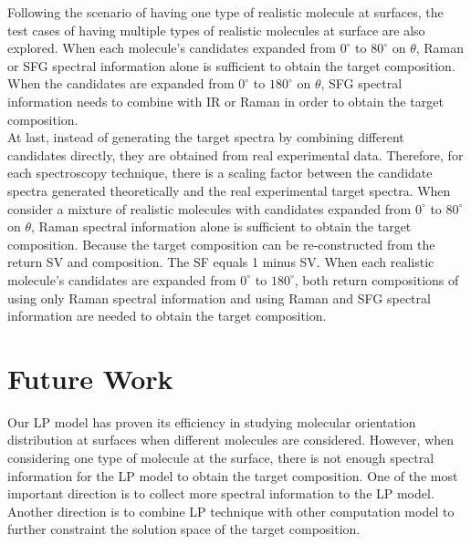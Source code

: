 Following the scenario of having one type of realistic molecule at surfaces, the test cases of having multiple types of realistic molecules at surface are also explored. When each molecule's candidates expanded from $0^{\circ}$ to $80^{\circ}$ on $\theta$, Raman or SFG spectral information alone is sufficient to obtain the target composition. When the candidates are expanded from $0^{\circ}$ to $180^{\circ}$ on $\theta$, SFG spectral information needs to combine with IR or Raman in order to obtain the target composition. \\

At last, instead of generating the target spectra by combining different candidates directly, they are obtained from real experimental data. Therefore, for each spectroscopy technique, there is a scaling factor between the candidate spectra generated theoretically and the real experimental target spectra. When consider a mixture of realistic molecules with candidates expanded from $0^{\circ}$ to $80^{\circ}$ on $\theta$, Raman spectral information alone is sufficient to obtain the target composition. Because the target composition can be re-constructed from the return SV and composition. The SF equals 1 minus SV. When each realistic molecule's candidates are expanded from $0^{\circ}$ to $180^{\circ}$, both return compositions of using only Raman spectral information and using Raman and SFG spectral information are needed to obtain the target composition. \\

\section{Future Work}
Our LP model has proven its efficiency in studying molecular orientation distribution at surfaces when different molecules are considered. However, when considering one type of molecule at the surface, there is not enough spectral information for the LP model to obtain the target composition. One of the most important direction is to collect more spectral information to the LP model. Another direction is to combine LP technique with other computation model to further constraint the solution space of the target composition.








